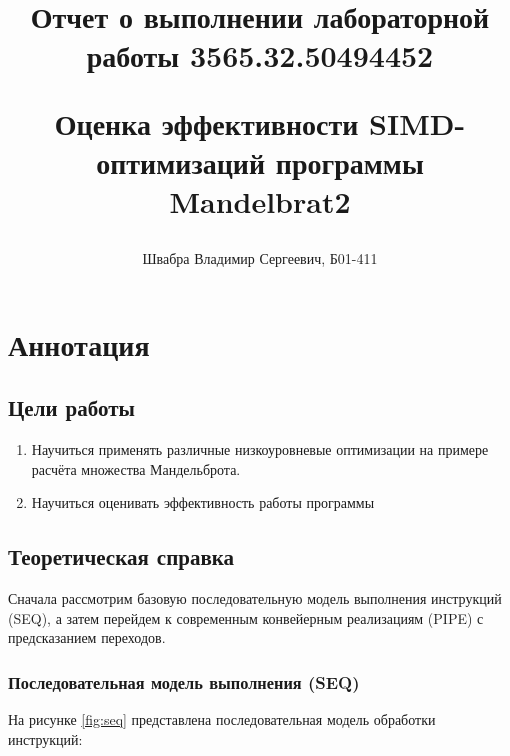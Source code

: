 \documentclass[12pt,a4paper]{article}
\title{
    Отчет о выполнении лабораторной работы 3565.32.50494452
    
    Оценка эффективности SIMD-оптимизаций программы Mandelbrat2
    }
\author{Швабра Владимир Сергеевич, Б01-411}
\begin{document}
\maketitle

\newpage

\tableofcontents

\newpage

\section{Аннотация}
\subsection{Цели работы}  
\begin{enumerate}
    \item Научиться применять различные низкоуровневые оптимизации на примере расчёта множества Мандельброта.
    \item Научиться оценивать эффективность работы программы
\end{enumerate}

\subsection{Теоретическая справка}

Сначала рассмотрим базовую последовательную модель выполнения инструкций (SEQ), а затем перейдем к современным конвейерным реализациям (PIPE) с предсказанием переходов.

\subsubsection{Последовательная модель выполнения (SEQ)}
На рисунке \ref{fig:seq} представлена последовательная модель обработки инструкций:
\end{document}

